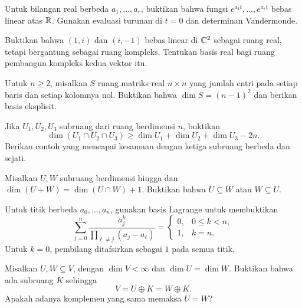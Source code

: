 \begin{latihan}\label{bebas:lat-eksponensial}
    Untuk bilangan real berbeda $a_1,\ldots,a_r$, buktikan bahwa
    fungsi $e^{a_1t},\ldots,e^{a_rt}$ bebas linear atas $\mathbb{R}$.
    Gunakan evaluasi turunan di $t=0$ dan determinan Vandermonde.
\end{latihan}

\begin{latihan}\label{bebas:lat-medan}
    Buktikan bahwa $(1,i)$ dan $(i,-1)$ bebas linear di $\mathbb{C}^2$
    sebagai ruang real, tetapi bergantung sebagai ruang kompleks.
    Tentukan basis real bagi ruang pembangun kompleks kedua vektor itu.
\end{latihan}

\begin{latihan}\label{bebas:lat-jumlah-nol}
    Untuk $n\ge2$, misalkan $S$ ruang matriks real $n\times n$
    yang jumlah entri pada setiap baris dan setiap kolomnya nol.
    Buktikan bahwa $\dim S=(n-1)^2$ dan berikan basis eksplisit.
\end{latihan}

\begin{latihan}\label{bebas:lat-tiga}
    Jika $U_1,U_2,U_3$ subruang dari ruang berdimensi $n$, buktikan
    \[
        \dim(U_1\cap U_2\cap U_3)
        \ge\dim U_1+\dim U_2+\dim U_3-2n.
    \]
    Berikan contoh yang mencapai kesamaan dengan ketiga subruang
    berbeda dan sejati.
\end{latihan}

\begin{latihan}\label{bebas:lat-selisih-dimensi}
    Misalkan $U,W$ subruang berdimensi hingga dan
    $\dim(U+W)=\dim(U\cap W)+1$.
    Buktikan bahwa $U\subseteq W$ atau $W\subseteq U$.
\end{latihan}

\begin{latihan}\label{bebas:lat-lagrange}
    Untuk titik berbeda $a_0,\ldots,a_n$, gunakan basis Lagrange
    untuk membuktikan
    \[
        \sum_{j=0}^{n}\frac{a_j^k}
        {\displaystyle\prod_{\ell\ne j}(a_j-a_\ell)}
        =\begin{cases}0,&0\le k<n,\\1,&k=n.\end{cases}
    \]
    Untuk $k=0$, pembilang ditafsirkan sebagai $1$ pada semua titik.
\end{latihan}

\begin{latihan}\label{bebas:lat-komplemen}
    Misalkan $U,W\subseteq V$, dengan $\dim V<\infty$ dan
    $\dim U=\dim W$. Buktikan bahwa ada subruang $K$ sehingga
    \[
        V=U\oplus K=W\oplus K.
    \]
    Apakah adanya komplemen yang sama memaksa $U=W$?
\end{latihan}


